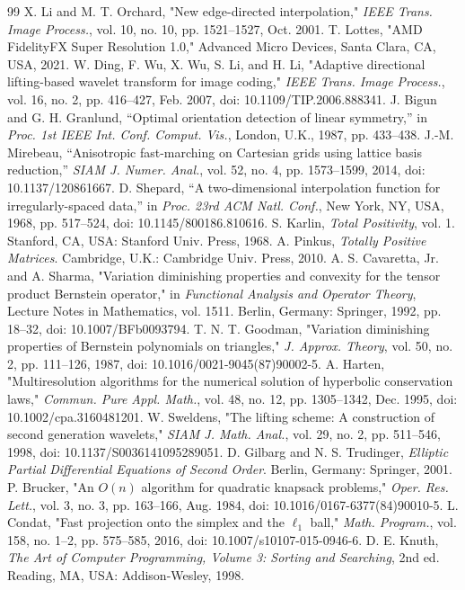 \documentclass[journal]{IEEEtran}
\begin{document}
\begin{thebibliography}{99}
X. Li and M. T. Orchard, "New edge-directed interpolation," \emph{IEEE
Trans. Image Process.}, vol. 10, no. 10, pp. 1521--1527, Oct. 2001.
T. Lottes, "AMD FidelityFX Super Resolution 1.0," Advanced Micro Devices,
Santa Clara, CA, USA, 2021.
W. Ding, F. Wu, X. Wu, S. Li, and H. Li, "Adaptive directional
lifting-based wavelet transform for image coding," \emph{IEEE Trans. Image
Process.}, vol. 16, no. 2, pp. 416--427, Feb. 2007,
doi: 10.1109/TIP.2006.888341.
J. Bigun and G. H. Granlund, ``Optimal orientation detection of linear
symmetry,'' in \emph{Proc. 1st IEEE Int. Conf. Comput. Vis.}, London, U.K.,
1987, pp. 433--438.
J.-M. Mirebeau, ``Anisotropic fast-marching on Cartesian grids using lattice
basis reduction,'' \emph{SIAM J. Numer. Anal.}, vol. 52, no. 4,
pp. 1573--1599, 2014, doi: 10.1137/120861667.
D. Shepard, ``A two-dimensional interpolation function for irregularly-spaced
data,'' in \emph{Proc. 23rd ACM Natl. Conf.}, New York, NY, USA, 1968,
pp. 517--524, doi: 10.1145/800186.810616.
S. Karlin, \emph{Total Positivity}, vol. 1. Stanford, CA, USA: Stanford
Univ. Press, 1968.
A. Pinkus, \emph{Totally Positive Matrices}. Cambridge, U.K.: Cambridge
Univ. Press, 2010.
A. S. Cavaretta, Jr. and A. Sharma, "Variation diminishing properties and
convexity for the tensor product Bernstein operator," in \emph{Functional
Analysis and Operator Theory}, Lecture Notes in Mathematics, vol. 1511.
Berlin, Germany: Springer, 1992, pp. 18--32,
doi: 10.1007/BFb0093794.
T. N. T. Goodman, "Variation diminishing properties of Bernstein
polynomials on triangles," \emph{J. Approx. Theory}, vol. 50, no. 2,
pp. 111--126, 1987, doi: 10.1016/0021-9045(87)90002-5.
A. Harten, "Multiresolution algorithms for the numerical solution of
hyperbolic conservation laws," \emph{Commun. Pure Appl. Math.}, vol. 48,
no. 12, pp. 1305--1342, Dec. 1995,
doi: 10.1002/cpa.3160481201.
W. Sweldens, "The lifting scheme: A construction of second generation
wavelets," \emph{SIAM J. Math. Anal.}, vol. 29, no. 2, pp. 511--546, 1998,
doi: 10.1137/S0036141095289051.
D. Gilbarg and N. S. Trudinger, \emph{Elliptic Partial Differential Equations
of Second Order}. Berlin, Germany: Springer, 2001.
P. Brucker, "An $O(n)$ algorithm for quadratic knapsack problems,"
\emph{Oper. Res. Lett.}, vol. 3, no. 3, pp. 163--166, Aug. 1984,
doi: 10.1016/0167-6377(84)90010-5.
L. Condat, "Fast projection onto the simplex and the $\ell_1$ ball,"
\emph{Math. Program.}, vol. 158, no. 1--2, pp. 575--585, 2016,
doi: 10.1007/s10107-015-0946-6.
D. E. Knuth, \emph{The Art of Computer Programming, Volume 3: Sorting
and Searching}, 2nd ed. Reading, MA, USA: Addison-Wesley, 1998.
\end{thebibliography}
\end{document}
